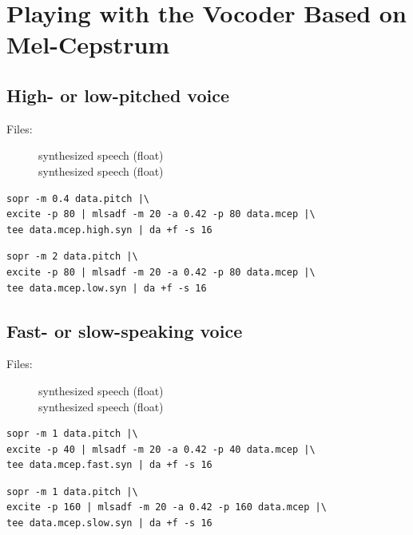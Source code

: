 \documentclass[a4paper,10pt]{article}
\begin{document}
\section{Playing with the Vocoder Based on Mel-Cepstrum}

\subsection{High- or low-pitched voice}

\begin{description}
\item[Files:]
  synthesized speech (float)\\
  synthesized speech (float)
\end{description}

\begin{verbatim}
sopr -m 0.4 data.pitch |\
excite -p 80 | mlsadf -m 20 -a 0.42 -p 80 data.mcep |\
tee data.mcep.high.syn | da +f -s 16
\end{verbatim}

\begin{verbatim}
sopr -m 2 data.pitch |\
excite -p 80 | mlsadf -m 20 -a 0.42 -p 80 data.mcep |\
tee data.mcep.low.syn | da +f -s 16
\end{verbatim}

\subsection{Fast- or slow-speaking voice}

\begin{description}
\item[Files:]
  synthesized speech (float)\\
  synthesized speech (float)
\end{description}

\begin{verbatim}
sopr -m 1 data.pitch |\
excite -p 40 | mlsadf -m 20 -a 0.42 -p 40 data.mcep |\
tee data.mcep.fast.syn | da +f -s 16
\end{verbatim}

\begin{verbatim}
sopr -m 1 data.pitch |\
excite -p 160 | mlsadf -m 20 -a 0.42 -p 160 data.mcep |\
tee data.mcep.slow.syn | da +f -s 16
\end{verbatim}
\end{document}
